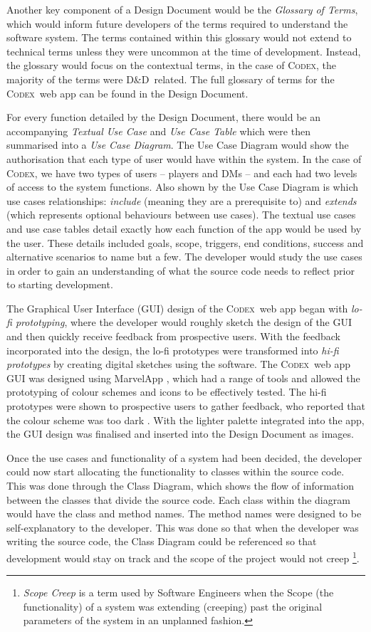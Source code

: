 \documentclass[final]{cmpreport}
\newcommand{\dnd}{D\&D}
\newcommand{\Codex}{\textsc{Codex}}
\begin{document}
		Another key component of a Design Document would be the \emph{Glossary of Terms}, which would inform future developers of the terms required to understand the software system. The terms contained within this glossary would not extend to technical terms unless they were uncommon at the time of development. Instead, the glossary would focus on the contextual terms, in the case of \Codex, the majority of the terms were \dnd \ related. The full glossary of terms for the \Codex \ web app can be found in the Design Document.
		
		For every function detailed by the Design Document, there would be an accompanying \emph{Textual Use Case} and \emph{Use Case Table} which were then summarised into a \emph{Use Case Diagram}. The Use Case Diagram would show the authorisation that each type of user would have within the system. In the case of \Codex, we have two types of users -- players and DMs -- and each had two levels of access to the system functions. Also shown by the Use Case Diagram is which use cases relationships: \emph{include} (meaning they are a prerequisite to) and \emph{extends} (which represents optional behaviours between use cases). The textual use cases and use case tables detail exactly how each function of the app would be used by the user. These details included goals, scope, triggers, end conditions, success and alternative scenarios to name but a few. The developer would study the use cases in order to gain an understanding of what the source code needs to reflect prior to starting development.

		The Graphical User Interface (GUI) design of the \Codex \ web app began with \emph{lo-fi prototyping}, where the developer would roughly sketch the design of the GUI and then quickly receive feedback from prospective users. With the feedback incorporated into the design, the lo-fi prototypes were transformed into \emph{hi-fi prototypes} by creating digital sketches using the software. The \Codex \ web app GUI was designed using MarvelApp \citep{marvelapp}, which had a range of tools and allowed the prototyping of colour schemes and icons to be effectively tested. The hi-fi prototypes were shown to prospective users to gather feedback, who reported that the colour scheme was too dark \citep{GUIDesign}. With the lighter palette integrated into the app, the GUI design was finalised and inserted into the Design Document as images. 
		
		Once the use cases and functionality of a system had been decided, the developer could now start allocating the functionality to classes within the source code. This was done through the Class Diagram, which shows the flow of information between the classes that divide the source code. Each class within the diagram would have the class and method names. The method names were designed to be self-explanatory to the developer. This was done so that when the developer was writing the source code, the Class Diagram could be referenced so that development would stay on track and the scope of the project would not creep \footnote{\emph{Scope Creep} is a term used by Software Engineers when the Scope (the functionality) of a system was extending (creeping) past the original parameters of the system in an unplanned fashion.}.
		
\end{document}
